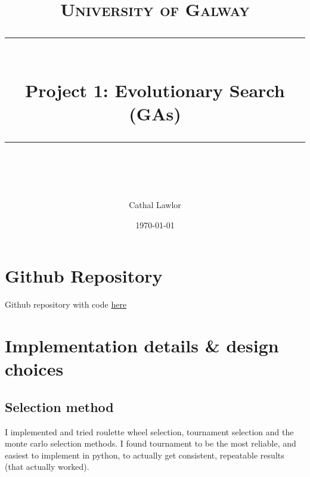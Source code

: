\documentclass[11pt]{scrartcl} %
\title{	
	\normalfont\normalsize
	\textsc{University of Galway}\\ %
	\vspace{25pt} %
	\rule{\linewidth}{0.5pt}\\ %
	\vspace{20pt} %
	{\huge  Project 1: Evolutionary Search (GAs)}\\ %
	\vspace{12pt} %
	\rule{\linewidth}{2pt}\\ %
	\vspace{12pt} %
}
\author{\LARGE Cathal Lawlor} %
\date{\normalsize\today} %
\begin{document}
\maketitle %







\section{Github Repository}
Github repository with code \href{https://github.com/Laan33/ai_project_1}{here}

\section{Implementation details \& design choices}

\subsection{Selection method}
I implemented and tried roulette wheel selection, tournament selection and the monte carlo selection methods.
I found tournament to be the most reliable, and easiest to implement in python, to actually get consistent, repeatable results (that actually worked).
\end{document}
